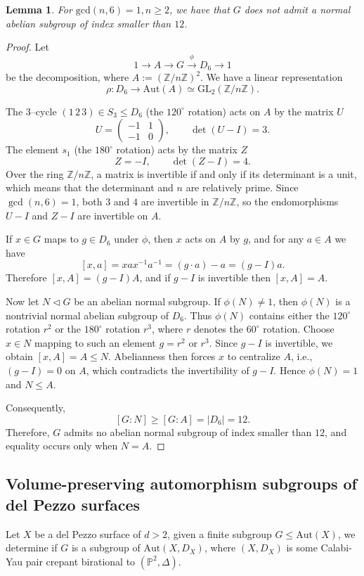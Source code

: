 \documentclass[a4paper,12pt,oneside]{amsart}
\numberwithin{equation}{section}
\newtheorem{lemma}[theorem]{Lemma}
\theoremstyle{definition}
\theoremstyle{remark}
\newcommand{\Ptwo}{\mathbb{P}^2}
\begin{document}
\begin{lemma} \label{grp}
For $\mathrm{gcd}(n,6)=1,n\geq 2$, we have that $G$ does not admit a normal abelian subgroup of index smaller than $12$.
\end{lemma}
\begin{proof}
Let 
\[
1 \rightarrow A \rightarrow G \xrightarrow{\phi} D_6 \rightarrow 1
\]
be the decomposition, where $A:= (\mathbb{Z}/n\mathbb{Z})^2$. We have a linear representation 
\[
\rho: D_6 \rightarrow \mathrm{Aut}(A) \simeq \mathrm{GL}_2(\mathbb{Z}/n\mathbb{Z}).
\]

The $3$–cycle $(1\,2\,3)\in S_3 \leqslant D_6$ (the $120^\circ$ rotation) acts on $A$ by the matrix $U$
\[
U = \begin{pmatrix} -1 & 1 \\ -1 & 0 \end{pmatrix}, \qquad \det(U - I) = 3.
\]
The element $s_1$ (the $180^\circ$ rotation) acts by the matrix $Z$
\[
Z = -I, \qquad \det(Z - I) = 4.
\]
Over the ring $\mathbb{Z}/n\mathbb{Z}$, a matrix is invertible if and only if its determinant is a unit, which means that the determinant and $n$ are relatively prime. Since $\gcd(n,6)=1$, both $3$ and $4$ are invertible in $\mathbb{Z}/n\mathbb{Z}$, so the endomorphisms $U - I$ and $Z - I$ are invertible on $A$.

If $x \in G$ maps to $g \in D_6$ under $\phi$, then $x$ acts on $A$ by $g$, and for any $a \in A$ we have
\[
[x,a] = x a x^{-1} a^{-1} = (g \cdot a) - a = (g - I)a.
\]
Therefore $[x,A] = (g - I)A$, and if $g - I$ is invertible then $[x,A] = A$.

Now let $N \lhd G$ be an abelian normal subgroup. If $\phi(N)\neq 1$, then $\phi(N)$ is a nontrivial normal abelian subgroup of $D_6$. Thus $\phi(N)$ contains either the $120^\circ$ rotation $r^2$ or the $180^\circ$ rotation $r^3$, where $r$ denotes the $60^\circ$ rotation. Choose $x \in N$ mapping to such an element $g=r^2$ or $r^3$. Since $g - I$ is invertible, we obtain $[x,A] = A \leqslant N$. Abelianness then forces $x$ to centralize $A$, i.e.,\ $(g - I) = 0$ on $A$, which contradicts the invertibility of $g - I$. Hence $\phi(N)=1$ and $N \leqslant A$.

Consequently,
\[
[G:N] \ge [G:A] = |D_6| = 12.
\]
Therefore, $G$ admits no abelian normal subgroup of index smaller than $12$, and equality occurs only when $N = A$.
\end{proof}


\subsection{Volume-preserving automorphism subgroups of del Pezzo surfaces}
Let $X$ be a del Pezzo surface of $d>2$, given a finite subgroup $G\leqslant \mathrm{Aut}(X)$, we determine if $G$ is a subgroup of $\mathrm{Aut}(X,D_X)$, where $(X,D_X)$ is some Calabi-Yau pair crepant birational to $(\Ptwo, \Delta)$. 
\end{document}
